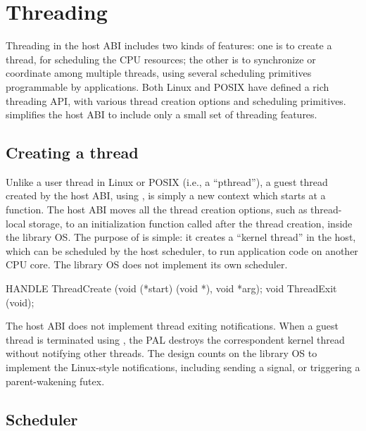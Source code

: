 \section{Threading}
\label{sec:abi:thread}

Threading in the host ABI includes two kinds of features:
one is to create a thread, for scheduling the CPU resources; the other is to synchronize or coordinate among multiple threads,
using several scheduling primitives programmable by applications.
Both Linux and POSIX have defined a rich threading API, with various thread creation options
and scheduling primitives.
\graphene{} simplifies the host ABI
to include only a small set of threading features.



\subsection*{Creating a thread}



Unlike a user thread in Linux or POSIX (i.e., a ``pthread''),
a guest thread created by the host ABI,
using ,
is simply a new context which starts at a function.
The host ABI
moves all the thread creation options,
such as thread-local storage,
to an initialization function called after the thread creation,
inside the library OS.
The purpose of 
is simple: it creates a ``kernel thread'' in the host,
which can be scheduled by the host scheduler,
to run application code on another CPU core.
The \graphene{} library OS does not implement its own scheduler.


\begin{paldef}
HANDLE ThreadCreate (void (*start) (void *), void *arg);
void ThreadExit (void);
\end{paldef}


The host ABI does not implement thread exiting notifications.
When a guest thread is terminated using , the PAL destroys the correspondent kernel thread
without notifying other threads.
The design counts on the library OS to implement the Linux-style notifications,
including
sending a  signal,
or triggering a parent-wakening futex.




\subsection*{Scheduler}




